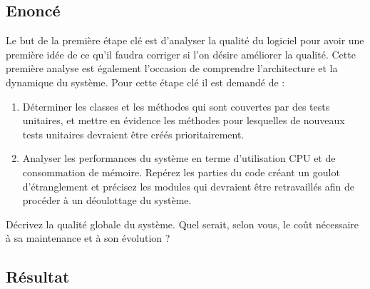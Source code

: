 \documentclass[12pt,a4paper,final]{article}
\begin{document}
\subsection{Enoncé}
Le but de la première étape clé est d'analyser la qualité du logiciel pour avoir une première idée de ce qu'il faudra corriger si l'on désire améliorer la qualité. Cette première analyse est également l'occasion de comprendre l'architecture et la dynamique du système.
Pour cette étape clé il est demandé de :
\begin{enumerate}
\item Déterminer les classes et les méthodes qui sont couvertes par des tests unitaires, et mettre en évidence les méthodes pour lesquelles de nouveaux tests unitaires devraient être créés prioritairement.
\item Analyser les performances du système en terme d'utilisation CPU et de consommation de mémoire. Repérez les parties du code créant un goulot d'étranglement et précisez les modules qui devraient être retravaillés afin de procéder à un déoulottage du système.
\end{enumerate}
Décrivez la qualité globale du système. Quel serait, selon vous, le coût nécessaire à sa maintenance et à son évolution ?
\subsection{Résultat}
\end{document}
